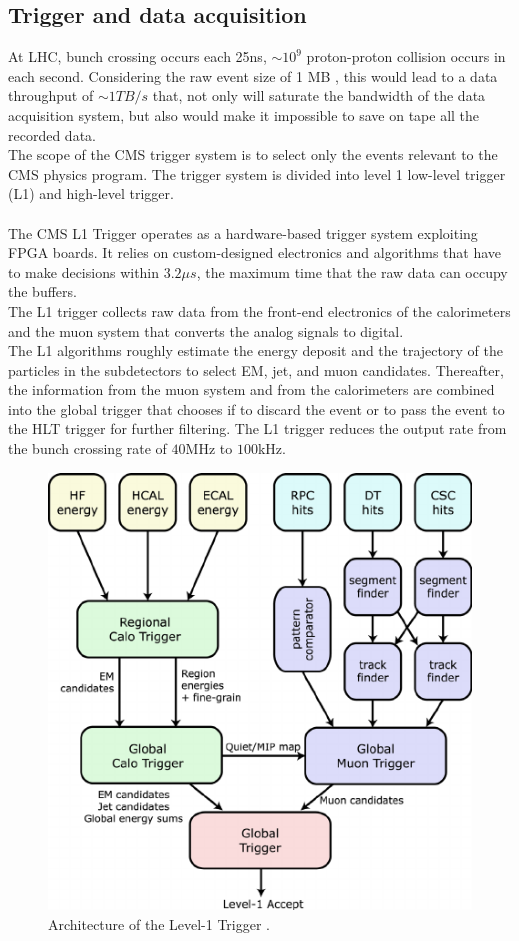 \subsection{Trigger and data acquisition}
At LHC, bunch crossing occurs each 25ns, \ie $\sim 10^9$ proton-proton collision occurs in each second. Considering the raw event size of 1 MB \cite{Franzoni2016DatasetAnalyses}, this would lead to a data throughput of  $\sim 1TB/s$ that, not only will saturate the bandwidth of the data acquisition system, but also would make it impossible to save on tape all the recorded data.\\
The scope of the CMS trigger system is to select only the events relevant to the CMS physics program.
The trigger system is divided into level 1 low-level trigger (L1) and high-level trigger.\\
\\
The CMS L1 Trigger \cite{Musenich2000CMSSystems} operates as a hardware-based trigger system exploiting FPGA boards. It relies on custom-designed electronics and algorithms that have to make decisions within $3.2 \mu s$, the maximum time that the raw data can occupy the buffers.\\
The L1 trigger collects raw data from the front-end electronics of the calorimeters and the muon system that converts the analog signals to digital.\\
The L1 algorithms roughly estimate the energy deposit and the trajectory of the particles in the subdetectors to select EM, jet, and muon candidates. Thereafter, the information from the muon system and from the calorimeters are combined into the global trigger that chooses if to discard the event or to pass the event to the HLT trigger for further filtering.
The L1 trigger reduces the output rate from the bunch crossing rate of $40$MHz to $100$kHz.
\\
\begin{figure}[h!]
    \centering
    \includegraphics[width=0.6\linewidth]{fig/chap03-cms/L1.png}
    \caption{Architecture of the Level-1 Trigger \cite{Brooke2003HardwareTrigger}.}
    \label{fig:l1}
\end{figure}
